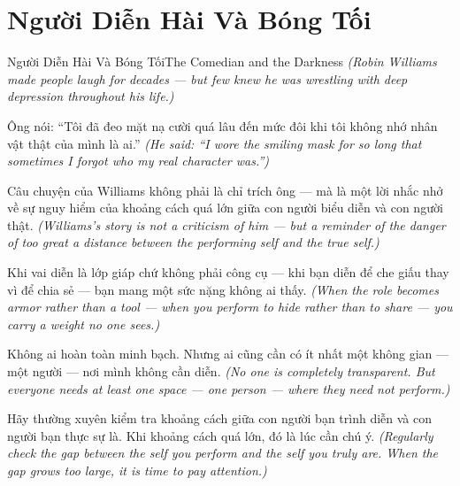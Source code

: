 \section{Người Diễn Hài Và Bóng Tối}
\begin{truyen}{Người Diễn Hài Và Bóng Tối}{The Comedian and the Darkness}
\textit{(Robin Williams made people laugh for decades — but few knew he was wrestling with deep depression throughout his life.)}

Ông nói: ``Tôi đã đeo mặt nạ cười quá lâu đến mức đôi khi tôi không nhớ nhân vật thật của mình là ai.''
\textit{(He said: ``I wore the smiling mask for so long that sometimes I forgot who my real character was.'')}

Câu chuyện của Williams không phải là chỉ trích ông — mà là một lời nhắc nhở về sự nguy hiểm của khoảng cách quá lớn giữa con người biểu diễn và con người thật.
\textit{(Williams's story is not a criticism of him — but a reminder of the danger of too great a distance between the performing self and the true self.)}

Khi vai diễn là lớp giáp chứ không phải công cụ — khi bạn diễn để che giấu thay vì để chia sẻ — bạn mang một sức nặng không ai thấy.
\textit{(When the role becomes armor rather than a tool — when you perform to hide rather than to share — you carry a weight no one sees.)}

Không ai hoàn toàn minh bạch. Nhưng ai cũng cần có ít nhất một không gian — một người — nơi mình không cần diễn.
\textit{(No one is completely transparent. But everyone needs at least one space — one person — where they need not perform.)}

\end{truyen}

\begin{baihoc}
Hãy thường xuyên kiểm tra khoảng cách giữa con người bạn trình diễn và con người bạn thực sự là. Khi khoảng cách quá lớn, đó là lúc cần chú ý.
\textit{(Regularly check the gap between the self you perform and the self you truly are. When the gap grows too large, it is time to pay attention.)}
\end{baihoc}
\ngancach

